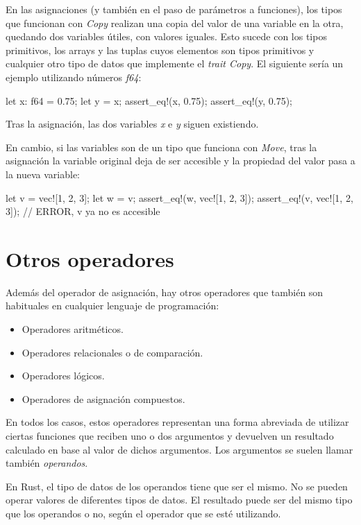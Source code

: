 En las asignaciones (y también en el paso de parámetros a funciones), los tipos que funcionan con \textit{Copy} realizan una copia del valor de una variable en la otra, quedando dos variables útiles, con valores iguales. Esto sucede con los tipos primitivos, los arrays y las tuplas cuyos elementos son tipos primitivos y cualquier otro tipo de datos que implemente el \textit{trait Copy}. El siguiente sería un ejemplo utilizando números \textit{f64}:

\vspace{0.7em}
\begin{Codigo}
let x: f64 = 0.75;
let y = x;
assert_eq!(x, 0.75);
assert_eq!(y, 0.75);
\end{Codigo}

Tras la asignación, las dos variables \textit{x} e \textit{y} siguen existiendo.

En cambio, si las variables son de un tipo que funciona con \textit{Move}, tras la asignación la variable original deja de ser accesible y la propiedad del valor pasa a la nueva variable:

\vspace{0.7em}
\begin{Codigo}
let v = vec![1, 2, 3];
let w = v;
assert_eq!(w, vec![1, 2, 3]);
assert_eq!(v, vec![1, 2, 3]); // ERROR, v ya no es accesible
\end{Codigo}

\section{Otros operadores}
Además del operador de asignación, hay otros operadores que también son habituales en cualquier lenguaje de programación:

\begin{itemize}
   \item Operadores aritméticos.
   \item Operadores relacionales o de comparación.
   \item Operadores lógicos.
   \item Operadores de asignación compuestos.
\end{itemize}

En todos los casos, estos operadores representan una forma abreviada de utilizar ciertas funciones que reciben uno o dos argumentos y devuelven un resultado calculado en base al valor de dichos argumentos. Los argumentos se suelen llamar también \textit{operandos}.

En Rust, el tipo de datos de los operandos tiene que ser el mismo. No se pueden operar valores de diferentes tipos de datos. El resultado puede ser del mismo tipo que los operandos o no, según el operador que se esté utilizando.

